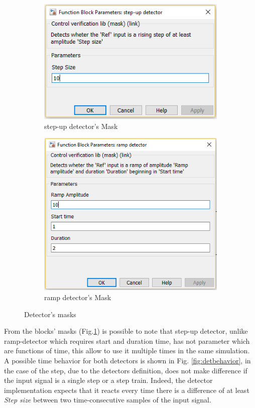 \begin{figure}[h]
\centering
\begin{subfigure}[b]{.48\textwidth}
\centering
\includegraphics[width=\textwidth]{Figs/stepmask.PNG}
\caption{step-up detector's Mask}
\end{subfigure}
\begin{subfigure}[b]{.48\textwidth}
\centering
\includegraphics[width=\textwidth]{Figs/rampmask.PNG}
\caption{ramp detector's Mask}
\end{subfigure}
\caption{Detector's masks}
\label{fig:detmasks}
\end{figure}
From the blocks' masks (Fig.\ref{fig:detmasks}) is possible to note that step-up detector, unlike ramp-detector which requires start and duration time, has not parameter which are functions of time, this allow to use it multiple times in the same simulation. A possible time behavior for both detectors is shown in Fig. \ref{fig:detbehavior}, in the case of the step, due to the detectors definition, does not make difference if the input signal is a single step or a step train. Indeed, the detector implementation expects that it reacts every time there is a difference of at least \textit{Step size} between two time-consecutive samples of the input signal.
